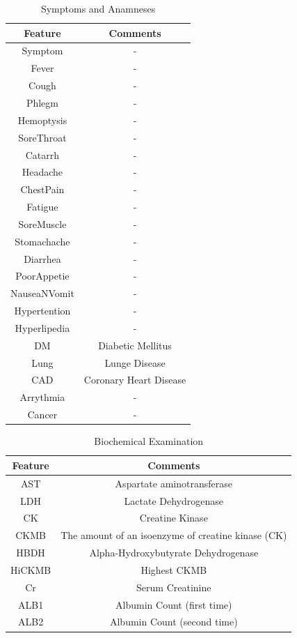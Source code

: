 \begin{table}[H]
\centering
\begin{tabular}{@{}cc@{}}
\toprule
Feature                   & Comments  \\ 
\toprule
Symptom & -		 \\
Fever & -	\\
Cough & -	 \\
Phlegm & -	 \\
Hemoptysis & -	  \\
SoreThroat & -\\
Catarrh & - \\
Headache & -	 \\
ChestPain & - \\
Fatigue & -	 \\
SoreMuscle & -	 \\
Stomachache & -		 \\
Diarrhea & -	 \\
PoorAppetie & -	 \\
NauseaNVomit & -  \\
Hypertention & -	  \\
Hyperlipedia & -	 \\
DM & Diabetic Mellitus\\
Lung & Lunge Disease	 \\
CAD & Coronary Heart Disease	 \\
Arrythmia & -  \\
Cancer & -  \\
\bottomrule
\end{tabular}
\caption{Symptoms and Anamneses}
\end{table}

\begin{table}[H]
\centering
\begin{tabular}{@{}cc@{}}
\toprule
Feature                   & Comments  \\ 
\toprule
AST	& Aspartate aminotransferase\\
LDH	& Lactate Dehydrogenase  \\
CK	& Creatine Kinase	 \\
CKMB &  The amount of an isoenzyme of creatine kinase (CK)  \\
HBDH & Alpha-Hydroxybutyrate Dehydrogenase \\
HiCKMB & Highest CKMB  \\
Cr & Serum Creatinine \\
ALB1 &	Albumin Count (first time) \\
ALB2 &	Albumin Count (second time) \\
\bottomrule
\end{tabular}
\caption{Biochemical Examination}
\end{table}

